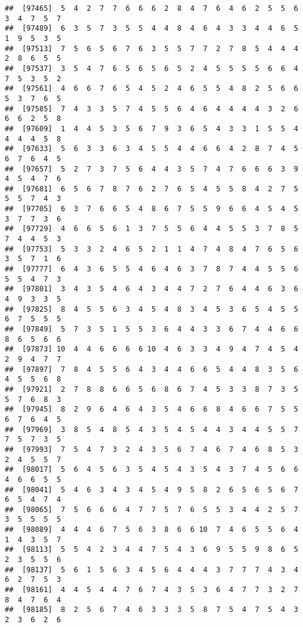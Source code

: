 \documentclass[
]{book}
\begin{document}
\begin{verbatim}
##  [97465]  5  4  2  7  7  6  6  6  2  8  4  7  6  4  6  2  5  5  6  3  4  7  5  7
##  [97489]  6  3  5  7  3  5  5  4  4  8  4  6  4  3  3  4  4  6  5  1  9  5  3  5
##  [97513]  7  5  6  5  6  7  6  3  5  5  7  7  2  7  8  5  4  4  4  2  8  6  5  5
##  [97537]  3  5  4  7  6  5  6  5  6  5  2  4  5  5  5  5  6  6  4  7  5  3  5  2
##  [97561]  4  6  6  7  6  5  4  5  2  4  6  5  5  4  8  2  5  6  6  5  3  7  6  5
##  [97585]  7  4  3  3  5  7  4  5  5  6  4  6  4  4  4  4  3  2  6  6  6  2  5  8
##  [97609]  1  4  4  5  3  5  6  7  9  3  6  5  4  3  3  1  5  5  4  4  4  4  5  8
##  [97633]  5  6  3  3  6  3  4  5  5  4  4  6  6  4  2  8  7  4  5  6  7  6  4  5
##  [97657]  5  2  7  3  7  5  6  4  4  3  5  7  4  7  6  6  6  3  9  4  5  4  7  6
##  [97681]  6  5  6  7  8  7  6  2  7  6  5  4  5  5  8  4  2  7  5  5  5  7  4  3
##  [97705]  6  3  7  6  6  5  4  8  6  7  5  5  9  6  6  4  5  4  5  3  7  7  3  6
##  [97729]  4  6  6  5  6  1  3  7  5  5  6  4  4  5  5  3  7  8  5  7  4  4  5  3
##  [97753]  5  3  3  2  4  6  5  2  1  1  4  7  4  8  4  7  6  5  6  3  5  7  1  6
##  [97777]  6  4  3  6  5  5  4  6  4  6  3  7  8  7  4  4  5  5  6  5  5  4  7  3
##  [97801]  3  4  3  5  4  6  4  3  4  4  7  2  7  6  4  4  6  3  6  4  9  3  3  5
##  [97825]  8  4  5  5  6  3  4  5  4  8  3  4  5  3  6  5  4  5  5  6  7  5  5  5
##  [97849]  5  7  3  5  1  5  5  3  6  4  4  3  3  6  7  4  4  6  6  8  6  5  6  6
##  [97873] 10  4  4  6  6  6  6 10  4  6  3  3  4  9  4  7  4  5  4  2  9  4  7  7
##  [97897]  7  8  4  5  5  6  4  3  4  4  6  6  5  4  4  8  3  5  6  4  5  5  6  8
##  [97921]  2  7  8  8  6  6  5  6  8  6  7  4  5  3  3  8  7  3  5  5  7  6  8  3
##  [97945]  8  2  9  6  4  6  4  3  5  4  6  6  8  4  6  6  7  5  5  6  7  6  4  5
##  [97969]  3  8  5  4  8  5  4  3  5  4  5  4  4  3  4  4  5  5  7  7  5  7  3  5
##  [97993]  7  5  4  7  3  2  4  3  5  6  7  4  6  7  4  6  8  5  3  2  4  5  5  7
##  [98017]  5  6  4  5  6  3  5  4  5  4  3  5  4  3  7  4  5  6  6  4  6  6  5  5
##  [98041]  5  4  6  3  4  3  4  5  4  9  5  8  2  6  5  6  5  6  7  6  5  4  7  4
##  [98065]  7  5  6  6  6  4  7  7  5  7  6  5  5  3  4  4  2  5  7  3  5  5  5  5
##  [98089]  4  4  4  6  7  5  6  3  8  6  6 10  7  4  6  5  5  6  4  1  4  3  5  7
##  [98113]  5  5  4  2  3  4  4  7  5  4  3  6  9  5  5  9  8  6  5  2  3  5  5  6
##  [98137]  5  6  1  5  6  3  4  5  6  4  4  4  3  7  7  7  4  3  4  6  2  7  5  3
##  [98161]  4  4  5  4  4  7  6  7  4  3  5  3  6  4  7  7  3  2  7  8  4  7  6  4
##  [98185]  8  2  5  6  7  4  6  3  3  3  5  8  7  5  4  7  5  4  3  2  3  6  2  6

\end{verbatim}
\end{document}
